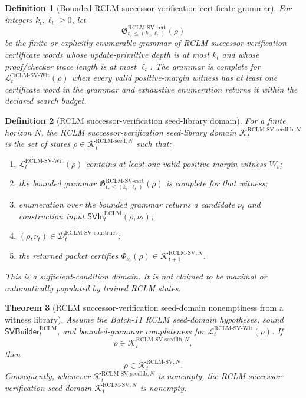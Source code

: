 \documentclass[11pt,a4paper]{article}
\newtheorem{theorem}{Theorem}[section]
\newtheorem{definition}[theorem]{Definition}
\newcommand{\Lcal}{\mathcal L}
\newcommand{\Kcal}{\mathcal K}
\newcommand{\Dcal}{\mathcal D}
\newcommand{\RCLM}{\mathrm{RCLM}}
\begin{document}
\begin{definition}[Bounded RCLM successor-verification certificate grammar]
\label{def:rclm-batch12b-bounded-sv-certificate-grammar}
For integers \(k_t,\ell_t\ge0\), let
\[
\mathfrak G_{t,\le(k_t,\ell_t)}^{\RCLM\text{-}\mathrm{SV\mbox{-}cert}}(\rho)
\]
be the finite or explicitly enumerable grammar of RCLM successor-verification certificate words whose update-primitive depth is at most \(k_t\) and whose proof/checker trace length is at most \(\ell_t\). The grammar is complete for \(\Lcal_t^{\RCLM\text{-}\mathrm{SV\mbox{-}Wit}}(\rho)\) when every valid positive-margin witness has at least one certificate word in the grammar and exhaustive enumeration returns it within the declared search budget.
\end{definition}

\begin{definition}[RCLM successor-verification seed-library domain]
\label{def:rclm-batch12b-sv-seed-library-domain}
For a finite horizon \(N\), the RCLM successor-verification seed-library domain \(\Kcal_t^{\RCLM\text{-}\mathrm{SV\mbox{-}seedlib},N}\) is the set of states \(\rho\in\Kcal_t^{\RCLM\text{-}\mathrm{seed},N}\) such that:
\begin{enumerate}[label=(\roman*),leftmargin=1.5em]
    \item \(\Lcal_t^{\RCLM\text{-}\mathrm{SV\mbox{-}Wit}}(\rho)\) contains at least one valid positive-margin witness \(W_t\);
    \item the bounded grammar \(\mathfrak G_{t,\le(k_t,\ell_t)}^{\RCLM\text{-}\mathrm{SV\mbox{-}cert}}(\rho)\) is complete for that witness;
    \item enumeration over the bounded grammar returns a candidate \(\nu_t\) and construction input \(\mathsf{SVIn}_t^{\RCLM}(\rho,\nu_t)\);
    \item \((\rho,\nu_t)\in\Dcal_t^{\RCLM\text{-}\mathrm{SV\mbox{-}construct}}\);
    \item the returned packet certifies \(\Phi_{\nu_t}(\rho)\in\Kcal_{t+1}^{\RCLM\text{-}\mathrm{SV},N}\).
\end{enumerate}
This is a sufficient-condition domain. It is not claimed to be maximal or automatically populated by trained RCLM states.
\end{definition}

\begin{theorem}[RCLM successor-verification seed-domain nonemptiness from a witness library]
\label{thm:rclm-batch12b-sv-seed-domain-nonemptiness}
Assume the Batch-11 RCLM seed-domain hypotheses, sound \(\mathsf{SVBuilder}_t^{\RCLM}\), and bounded-grammar completeness for \(\Lcal_t^{\RCLM\text{-}\mathrm{SV\mbox{-}Wit}}(\rho)\). If
\[
\rho\in\Kcal_t^{\RCLM\text{-}\mathrm{SV\mbox{-}seedlib},N},
\]
then
\[
\rho\in\Kcal_t^{\RCLM\text{-}\mathrm{SV},N}.
\]
Consequently, whenever \(\Kcal_t^{\RCLM\text{-}\mathrm{SV\mbox{-}seedlib},N}\) is nonempty, the RCLM successor-verification seed domain \(\Kcal_t^{\RCLM\text{-}\mathrm{SV},N}\) is nonempty.
\end{theorem}
\end{document}
